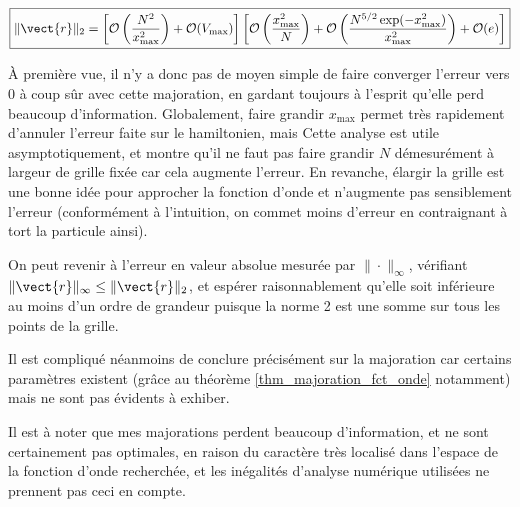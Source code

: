 \begin{equation}
    \boxed{\|\vect{r}\|_2 =  \left[\mathcal{O} \left( \frac{N^2}{x_\text{max}^2} \right) + \mathcal{O}(V_\text{max})  \right]     \left[ \mathcal{O} \left( \frac{x_\text{max}^2}{N} \right) + \mathcal{O} \left( \frac{N^{5/2} \exp(-x_\text{max}^2)}{x_\text{max}^2} \right) + \mathcal{O}(e) \right]}
\end{equation}

À première vue, il n'y a donc pas de moyen simple de faire converger l'erreur vers 0 à coup sûr avec cette majoration, en gardant toujours à l'esprit qu'elle perd beaucoup d'information. Globalement, faire grandir $x_\text{max}$ permet très rapidement d'annuler l'erreur faite sur le hamiltonien, mais  Cette analyse est utile asymptotiquement, et montre qu'il ne faut pas faire grandir $N$ démesurément à largeur de grille fixée car cela augmente l'erreur.  En revanche, élargir la grille est  une bonne idée pour approcher la fonction d'onde et n'augmente pas sensiblement l'erreur (conformément à l'intuition, on commet moins d'erreur en \og contraignant \fg{} à tort la particule ainsi).


On peut revenir à l'erreur en valeur absolue mesurée par $\|\cdot \|_\infty$, vérifiant $\| \vect{r} \|_\infty \le \| \vect{r} \|_2$, et espérer raisonnablement qu'elle soit  inférieure au moins d'un ordre de grandeur puisque la norme 2 est une somme sur tous les points de la grille.

Il est compliqué néanmoins de conclure précisément sur la majoration car certains paramètres existent (grâce au théorème \ref{thm_majoration_fct_onde} notamment) mais ne sont pas évidents à exhiber.

Il est à noter que mes majorations perdent beaucoup d'information, et ne sont certainement pas optimales, en raison du caractère très localisé dans l'espace de la fonction d'onde recherchée, et les inégalités d'analyse numérique utilisées ne prennent pas ceci en compte.